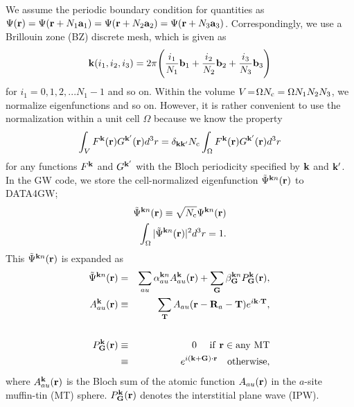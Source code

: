 \documentclass[a4paper,10pt,fleqn]{article}
\begin{document}
We assume the periodic boundary condition for
quantities as $\Psi({\bf r}) = \Psi({\bf r}+ N_1 {\bf a}_1)
= \Psi({\bf r}+ N_2 {\bf a}_2)= \Psi({\bf r}+ N_3 {\bf a}_3)$.
Correspondingly, we use a Brillouin zone (BZ) discrete mesh, 
which is given as
\begin{eqnarray}
{\bf k}(i_1,i_2,i_3)= 2 \pi \Biggr( \frac{i_1}{N_1} {\bf b}_1 
+ \frac{i_2}{N_2} {\bf b}_2 + \frac{i_3}{N_3} {\bf b}_3 \Biggr)
\label{kmesh}
\end{eqnarray}
for $i_1=\!0,\!1,\!2,...N_1\!-\!1$ and so on.
Within the volume $V\!=\!\Omega N_{\rm c}=\Omega N_1N_2N_3$, 
we normalize eigenfunctions 
and so on. However, it is rather convenient to use 
the normalization within a unit cell $\Omega$ because we know
the property
\begin{eqnarray}
  \int_V F^{\bf k} ({\bf r}) G^{\bf k'} ({\bf r}) d^3r = \delta_{\bf k k'} 
  N_{\rm c} \int_\Omega F^{\bf k} ({\bf r}) G^{\bf k'} ({\bf r}) d^3r
\end{eqnarray}
for any functions $F^{\bf k}$ and $G^{\bf k'}$ 
with the Bloch periodicity specified by ${\bf k}$ and ${\bf k'}$.
In the GW code, we store the cell-normalized eigenfunction 
$\tilde{\Psi}^{{\bf k}n}({\bf r})$ to {\sf DATA4GW};
\begin{eqnarray}
  \tilde{\Psi}^{{\bf k}n}({\bf r}) 
  \equiv %
  \sqrt{N_{\rm c}}\Psi^{{\bf k}n}({\bf r}) \\
  \int_\Omega |\tilde{\Psi}^{{\bf k}n}({\bf r})|^2 d^3r =1.
\end{eqnarray}
This $\tilde{\Psi}^{{\bf k}n}({\bf r})$ is expanded as
\begin{eqnarray}
\hspace{-3cm}\tilde{\Psi}^{{\bf k}n}({\bf r}) 
&=& \sum_{a u} \alpha^{{\bf k} n}_{au} A^{\bf k}_{a u}({\bf r})
 + \sum_{\bf G} \beta^{{\bf k}n}_{\bf G} P^{\bf k}_{\bf G}({\bf r}), \\
A^{\bf k}_{a u}({\bf r}) &\equiv& 
          \sum_{\bf T} A_{a u}({\bf r-R}_a-{\bf T})e^{i{\bf k\cdot T}}, \\
\nonumber \\
P^{\bf k}_{\bf G}({\bf r}) &\equiv& 0  \ \ \ {\rm \ if \ {\bf r} \in any \ MT} 
\nonumber \\
        &\equiv& e^{i({\bf k+G})\cdot{\bf r}} \ \ \ {\rm otherwise},
\end{eqnarray}
where $A^{\bf k}_{a u}({\bf r})$ is the Bloch sum of
the atomic function $A_{au}({\bf r})$ in the $a$-site muffin-tin (MT) sphere.
$P^{\bf k}_{\bf G}({\bf r})$ denotes the interstitial plane wave (IPW).
\end{document}
